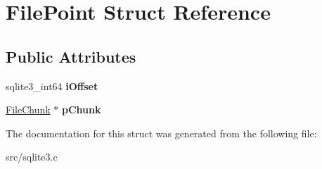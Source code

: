 \hypertarget{struct_file_point}{\section{File\-Point Struct Reference}
\label{struct_file_point}
}
\subsection*{Public Attributes}
\begin{DoxyCompactItemize}
\item 
\hypertarget{struct_file_point_a00a345e479cd37ebeb9e6ed475eb4112}{sqlite3\-\_\-int64 {\bfseries i\-Offset}}\label{struct_file_point_a00a345e479cd37ebeb9e6ed475eb4112}

\item 
\hypertarget{struct_file_point_aa17216d9d2559f14a00a2c72a8959298}{\hyperlink{struct_file_chunk}{File\-Chunk} $\ast$ {\bfseries p\-Chunk}}\label{struct_file_point_aa17216d9d2559f14a00a2c72a8959298}

\end{DoxyCompactItemize}


The documentation for this struct was generated from the following file\-:\begin{DoxyCompactItemize}
\item 
src/sqlite3.\-c\end{DoxyCompactItemize}
